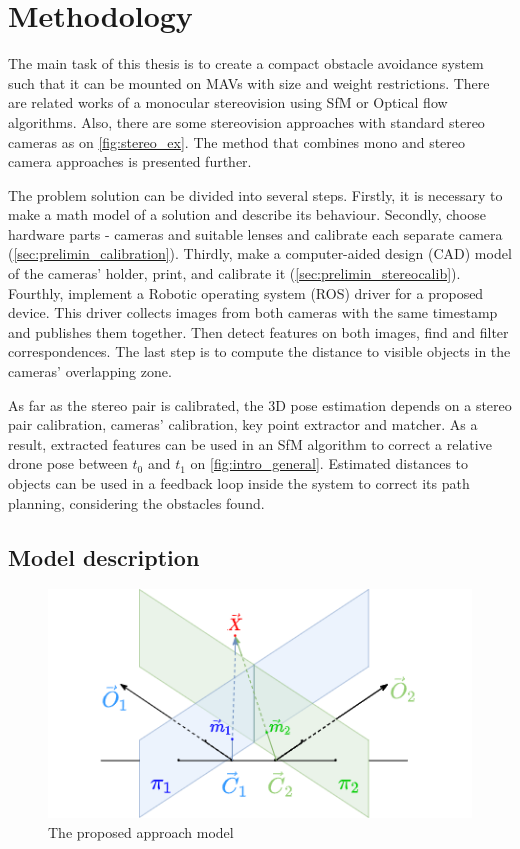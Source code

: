 \chapter{Methodology}

\label{chapter:methodology}

The main task of this thesis is to create a compact obstacle avoidance system such that it can be mounted on MAVs with size and weight restrictions.
There are related works of a monocular stereovision using SfM or Optical flow algorithms. 
Also, there are some stereovision approaches with standard stereo cameras as on \autoref{fig:stereo_ex}.
The method that combines mono and stereo camera approaches is presented further.

The problem solution can be divided into several steps. 
Firstly, it is necessary to make a math model of a solution and describe its behaviour. 
Secondly, choose hardware parts - cameras and suitable lenses and calibrate each separate camera (\autoref{sec:prelimin_calibration}).
Thirdly, make a computer-aided design (CAD) model of the cameras' holder, print, and calibrate it (\autoref{sec:prelimin_stereocalib}).
Fourthly, implement a Robotic operating system (ROS) driver for a proposed device. 
This driver collects images from both cameras with the same timestamp and publishes them together.
Then detect features on both images, find and filter correspondences.
The last step is to compute the distance to visible objects in the cameras' overlapping zone.

As far as the stereo pair is calibrated, the 3D pose estimation depends on a stereo pair calibration, cameras' calibration, key point extractor and matcher.
As a result, extracted features can be used in an SfM algorithm to correct a relative drone pose between $t_0$ and $t_1$ on \autoref{fig:intro_general}.
Estimated distances to objects can be used in a feedback loop inside the system to correct its path planning, considering the obstacles found.

\section{Model description}

\begin{figure}[h]
    \centering
    \includegraphics[width=.7\textwidth]{graphics/td90deg.png}
    \caption{The proposed approach model}
    \label{fig:td90deg}
\end{figure}

